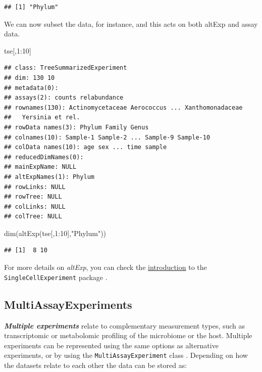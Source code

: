 \documentclass[
]{book}
\newenvironment{Shaded}{\begin{snugshade}}{\end{snugshade}}
\newcommand{\DecValTok}[1]{\textcolor[rgb]{0.00,0.00,0.81}{#1}}
\newcommand{\FunctionTok}[1]{\textcolor[rgb]{0.00,0.00,0.00}{#1}}
\newcommand{\NormalTok}[1]{#1}
\newcommand{\SpecialCharTok}[1]{\textcolor[rgb]{0.00,0.00,0.00}{#1}}
\newcommand{\StringTok}[1]{\textcolor[rgb]{0.31,0.60,0.02}{#1}}
\begin{document}
\begin{verbatim}
## [1] "Phylum"
\end{verbatim}

We can now subset the data, for instance, and this acts on both altExp and assay data.

\begin{Shaded}
\begin{Highlighting}[]
\NormalTok{tse[,}\DecValTok{1}\SpecialCharTok{:}\DecValTok{10}\NormalTok{]}
\end{Highlighting}
\end{Shaded}

\begin{verbatim}
## class: TreeSummarizedExperiment 
## dim: 130 10 
## metadata(0):
## assays(2): counts relabundance
## rownames(130): Actinomycetaceae Aerococcus ... Xanthomonadaceae
##   Yersinia et rel.
## rowData names(3): Phylum Family Genus
## colnames(10): Sample-1 Sample-2 ... Sample-9 Sample-10
## colData names(10): age sex ... time sample
## reducedDimNames(0):
## mainExpName: NULL
## altExpNames(1): Phylum
## rowLinks: NULL
## rowTree: NULL
## colLinks: NULL
## colTree: NULL
\end{verbatim}

\begin{Shaded}
\begin{Highlighting}[]
\FunctionTok{dim}\NormalTok{(}\FunctionTok{altExp}\NormalTok{(tse[,}\DecValTok{1}\SpecialCharTok{:}\DecValTok{10}\NormalTok{],}\StringTok{"Phylum"}\NormalTok{))}
\end{Highlighting}
\end{Shaded}

\begin{verbatim}
## [1]  8 10
\end{verbatim}

For more details on \emph{altExp}, you can check the \href{https://bioconductor.org/packages/release/bioc/vignettes/SingleCellExperiment/inst/doc/intro.html}{introduction} to the \texttt{SingleCellExperiment} package \citep{R_SingleCellExperiment}.

\hypertarget{mae}{%
\subsection{MultiAssayExperiments}\label{mae}}

\emph{\textbf{Multiple experiments}} relate to complementary measurement types,
such as transcriptomic or metabolomic profiling of the microbiome or
the host. Multiple experiments can be represented using the same
options as alternative experiments, or by using the
\texttt{MultiAssayExperiment} class \citep{Ramos2017}. Depending on how the
datasets relate to each other the data can be stored as:
\end{document}
